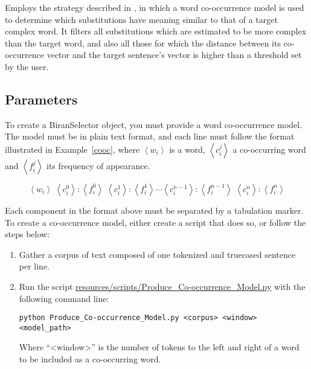 Employs the strategy described in \cite{Biran2011}, in which a word co-occurrence model is used to determine which substitutions have meaning similar to that of a target complex word. It filters all substitutions which are estimated to be more complex than the target word, and also all those for which the distance between its co-occurrence vector and the target sentence's vector is higher than a threshold set by the user.


\subsection{Parameters}

To create a BiranSelector object, you must provide a word co-occurrence model. The model must be in plain text format, and each line must follow the format illustrated in Example~\ref{cooc}, where $\left\langle w_{i} \right\rangle$ is a word, $\left\langle c_{i}^{j} \right\rangle$ a co-occurring word and $\left\langle f_{i}^{j} \right\rangle$ its frequency of appearance.

\begin{equation}
\label{cooc}
\left\langle w_{i} \right\rangle\; \left\langle c_{i}^{0} \right\rangle\!:\!\left\langle f_{i}^{0} \right\rangle\;\left\langle c_{i}^{1} \right\rangle\!:\!\left\langle f_{i}^{1} \right\rangle\cdots\left\langle c_{i}^{n-1} \right\rangle\!:\!\left\langle f_{i}^{n-1} \right\rangle \; \left\langle c_{i}^{n} \right\rangle\!:\!\left\langle f_{i}^{n} \right\rangle
\end{equation}

Each component in the format above must be separated by a tabulation marker. To create a co-occurrence model, either create a script that does so, or follow the steps below:

\begin{enumerate}
\item Gather a corpus of text composed of one tokenized and truecased sentence per line.
\item Run the script \url{resources/scripts/Produce_Co-occurrence_Model.py} with the following command line:

\begin{lstlisting}
python Produce_Co-occurrence_Model.py <corpus> <window> <model_path>
\end{lstlisting}

Where ``<window>'' is the number of tokens to the left and right of a word to be included as a co-occurring word.

\end{enumerate}

